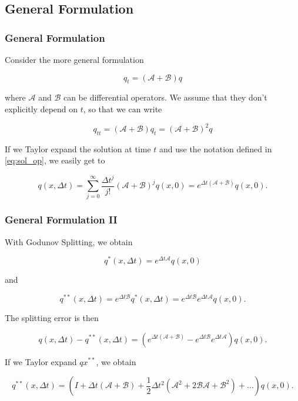\documentclass{beamer}
\newcommand{\ca}{\mathcal{A}}
\newcommand{\cb}{\mathcal{B}}
\renewcommand{\d}{\Delta}
\begin{document}
\subsection{General Formulation}
\begin{frame}
	\frametitle{General Formulation}
	Consider the more general formulation

	\begin{equation}
		q_t = (\ca+\cb)q
	\end{equation}

	where $\ca$ and $\cb$ can be differential operators. We assume that they don't explicitly depend on $t$, so that we can write

	\begin{equation}
		q_{tt} = (\ca+\cb)q_t=(\ca+\cb)^2q
	\end{equation}

	If we Taylor expand the solution at time $t$ and use the notation defined in \eqref{eq:sol_op}, we easily get to

	\begin{equation}\label{eq:exp_unsplit}
		q(x,\d t) = \sum_{j=0}^{\infty}\frac{\d t^j}{j!}(\ca + \cb)^jq(x,0) = e^{\d t(\ca +\cb)}q(x,0).
	\end{equation}


\end{frame}

\begin{frame}
	\frametitle{General Formulation II}
	With Godunov Splitting, we obtain

	\begin{equation}
		q^*(x,\d t)=e^{\d t \ca}q(x,0)
	\end{equation}

	and

	\begin{equation}
		q^{**}(x,\d t)=e^{\d t \cb}q^*(x,\d t) = e^{\d t \cb}e^{\d t \ca}q(x,0).
	\end{equation}

	The splitting error is then

	\begin{equation}
		q(x,\d t)-q^{**}(x,\d t) = (e^{\d t(\ca +\cb)}-e^{\d t \cb}e^{\d t \ca})q(x,0).
	\end{equation}

	If we Taylor expand $qx^{**}$, we obtain

	\begin{equation}\label{eq:exp_split}
		q^{**}(x,\d t) = (I+\d t(\ca + \cb)+\frac{1}{2}\d t^2(\ca^2+2\cb\ca+\cb^2)+\dots)q(x,0).
	\end{equation}

\end{frame}
\end{document}
